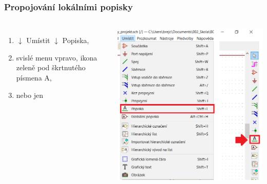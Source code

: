 \documentclass{beamer}
\begin{document}
\begin{frame}
	\frametitle{Propojování lokálními popisky}
	\begin{columns}
	
		\small
		\begin{enumerate}
			\item $\downarrow$ Umístit $\downarrow$ Popiska,
			\item svislé menu vpravo, ikona zeleně pod škrtnutého písmena A,
			\item {} nebo jen 
		\end{enumerate}
		
		\begin{center}
			\includegraphics[width=\textwidth]{obr/spoje05.png}
		\end{center}
		
	\end{columns}
\end{frame}
\end{document}

